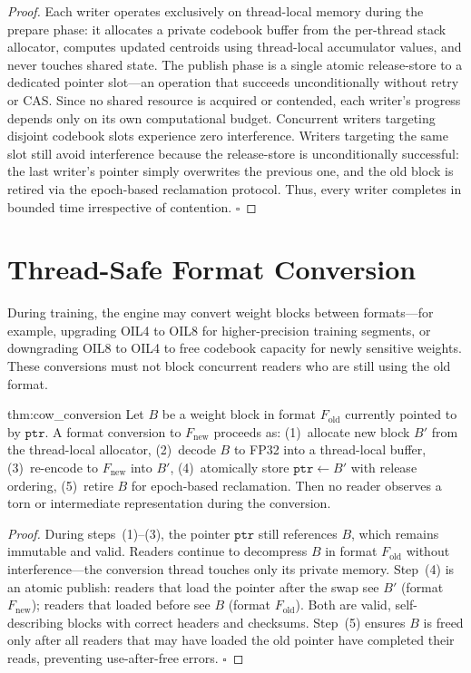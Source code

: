\begin{proof}
Each writer operates exclusively on thread-local memory during the prepare phase: it allocates a private codebook buffer from the per-thread stack allocator, computes updated centroids using thread-local accumulator values, and never touches shared state. The publish phase is a single atomic release-store to a dedicated pointer slot---an operation that succeeds unconditionally without retry or CAS. Since no shared resource is acquired or contended, each writer's progress depends only on its own computational budget. Concurrent writers targeting disjoint codebook slots experience zero interference. Writers targeting the same slot still avoid interference because the release-store is unconditionally successful: the last writer's pointer simply overwrites the previous one, and the old block is retired via the epoch-based reclamation protocol. Thus, every writer completes in bounded time irrespective of contention. $\square$
\end{proof}

\section{Thread-Safe Format Conversion}
\label{sec:format_conversion}

During training, the engine may convert weight blocks between formats---for example, upgrading OIL4 to OIL8 for higher-precision training segments, or downgrading OIL8 to OIL4 to free codebook capacity for newly sensitive weights. These conversions must not block concurrent readers who are still using the old format.

\begin{mythm}{thm:cow_conversion}
Let $B$ be a weight block in format $F_{\text{old}}$ currently pointed to by $\texttt{ptr}$. A format conversion to $F_{\text{new}}$ proceeds as: (1)~allocate new block $B'$ from the thread-local allocator, (2)~decode $B$ to FP32 into a thread-local buffer, (3)~re-encode to $F_{\text{new}}$ into $B'$, (4)~atomically store $\texttt{ptr} \leftarrow B'$ with release ordering, (5)~retire $B$ for epoch-based reclamation. Then no reader observes a torn or intermediate representation during the conversion.
\end{mythm}

\begin{proof}
During steps~(1)--(3), the pointer $\texttt{ptr}$ still references $B$, which remains immutable and valid. Readers continue to decompress $B$ in format $F_{\text{old}}$ without interference---the conversion thread touches only its private memory. Step~(4) is an atomic publish: readers that load the pointer after the swap see $B'$ (format $F_{\text{new}}$); readers that loaded before see $B$ (format $F_{\text{old}}$). Both are valid, self-describing blocks with correct headers and checksums. Step~(5) ensures $B$ is freed only after all readers that may have loaded the old pointer have completed their reads, preventing use-after-free errors. $\square$
\end{proof}

